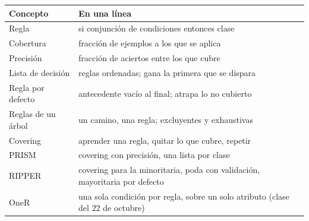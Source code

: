\documentclass[11pt,letterpaper]{article}
\begin{document}
\begin{center}
\small
\begin{tabular}{l>{\raggedright\arraybackslash}p{10.6cm}}
    \toprule
    \textbf{Concepto} & \textbf{En una línea} \\
    \midrule
    Regla & si conjunción de condiciones entonces clase \\
    Cobertura & fracción de ejemplos a los que se aplica \\
    Precisión & fracción de aciertos entre los que cubre \\
    Lista de decisión & reglas ordenadas; gana la primera que se dispara \\
    Regla por defecto & antecedente vacío al final; atrapa lo no
                        cubierto \\
    Reglas de un árbol & un camino, una regla; excluyentes y exhaustivas \\
    Covering & aprender una regla, quitar lo que cubre, repetir \\
    PRISM & covering con precisión, una lista por clase \\
    RIPPER & covering para la minoritaria, poda con validación,
             mayoritaria por defecto \\
    OneR & una sola condición por regla, sobre un solo atributo (clase
           del $22$ de octubre) \\
    \bottomrule
\end{tabular}
\end{center}
\end{document}
